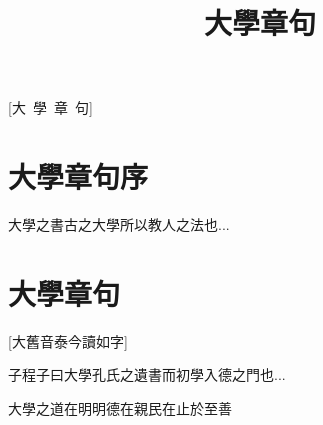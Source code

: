 \documentclass{zhvt-classic}
\title{大學章句}
\begin{document}
[大~學~章~句]

\setcounter{page}{1}
\tableofcontents

\mainmatter 

\chapter*{大學章句序} %

大學之書古之大學所以教人之法也...

\chapter*{大學章句}[大舊音泰今讀如字] %
\begin{fw} %
子程子曰大學孔氏之遺書而初學入德之門也...
\end{fw}

大學之道在明明德在親民在止於至善
\end{document}
